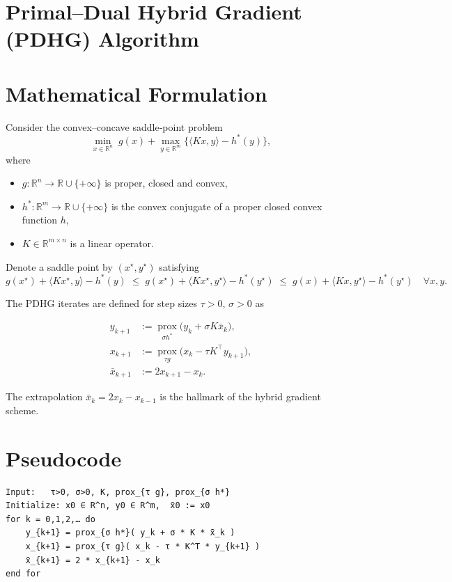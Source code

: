 \documentclass{article}
\begin{document}
\section*{Primal–Dual Hybrid Gradient (PDHG) Algorithm}

\section*{Mathematical Formulation}
Consider the convex–concave saddle‑point problem  
\[
\min_{x\in\mathbb R^{n}} \; g(x)+ \max_{y\in\mathbb R^{m}} \big\{ \langle Kx ,y\rangle - h^{*}(y)\big\},
\tag{1}
\]
where  

\begin{itemize}[noitemsep]
\item $g:\mathbb R^{n}\!\to\!\mathbb R\cup\{+\infty\}$ is proper, closed and convex,
\item $h^{*}:\mathbb R^{m}\!\to\!\mathbb R\cup\{+\infty\}$ is the convex conjugate of a proper closed convex function $h$,
\item $K\in\mathbb R^{m\times n}$ is a linear operator.
\end{itemize}
Denote a saddle point by $(x^{\star},y^{\star})$ satisfying
\[
g(x^{\star})+ \langle Kx^{\star},y\rangle - h^{*}(y)
\;\le\;
g(x^{\star})+ \langle Kx^{\star},y^{\star}\rangle - h^{*}(y^{\star})
\;\le\;
g(x)+ \langle Kx ,y^{\star}\rangle - h^{*}(y^{\star})
\quad\forall x,y .
\]

The PDHG iterates are defined for step sizes $\tau>0$, $\sigma>0$ as  

\[
\boxed{
\begin{aligned}
y_{k+1} &:= \operatorname*{prox}_{\sigma h^{*}}\!\bigl(y_{k}+ \sigma K\bar x_{k}\bigr), \tag{2a}\\[4pt]
x_{k+1} &:= \operatorname*{prox}_{\tau g}\!\bigl(x_{k}- \tau K^{\!\top} y_{k+1}\bigr), \tag{2b}\\[4pt]
\bar x_{k+1} &:= 2x_{k+1}-x_{k}. \tag{2c}
\end{aligned}}
\]

The extrapolation $\bar x_{k}=2x_{k}-x_{k-1}$ is the hallmark of the hybrid gradient scheme.

\section*{Pseudocode}
\begin{verbatim}
Input:   τ>0, σ>0, K, prox_{τ g}, prox_{σ h*}
Initialize: x0 ∈ R^n, y0 ∈ R^m,  x̄0 := x0
for k = 0,1,2,… do
    y_{k+1} = prox_{σ h*}( y_k + σ * K * x̄_k )
    x_{k+1} = prox_{τ g}( x_k - τ * K^T * y_{k+1} )
    x̄_{k+1} = 2 * x_{k+1} - x_k
end for
\end{verbatim}
\end{document}
